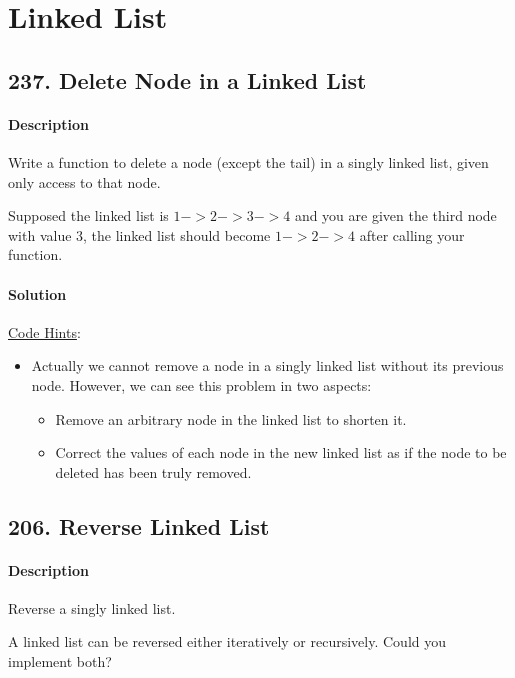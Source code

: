 \section{Linked List}

\subsection{237. Delete Node in a Linked List}

\paragraph{\color{white} \colorbox{Mahogany}{Description}}
Write a function to delete a node (except the tail) in a singly linked list, given only access to that node.

Supposed the linked list is $1 -> 2 -> 3 -> 4$ and you are given the third node with value 3, the linked list should become $1 -> 2 -> 4$ after calling your function.

\paragraph{\color{white} \colorbox{OliveGreen}{Solution}}
\underline{Code Hints}:
\begin{itemize}
    \item Actually we cannot remove a node in a singly linked list without its previous node. However, we can see this problem in two aspects:
    \begin{itemize}
        \item Remove an arbitrary node in the linked list to shorten it.
        \item Correct the values of each node in the new linked list as if the node to be deleted has been truly removed.
    \end{itemize}
\end{itemize}

\subsection{206. Reverse Linked List}

\paragraph{\color{white} \colorbox{Mahogany}{Description}}
Reverse a singly linked list.

A linked list can be reversed either iteratively or recursively. Could you implement both?


